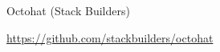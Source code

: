 \documentclass[DIV16,twocolumn,10pt]{scrreprt}
\begin{document}
\begin{hcarentry}{Octohat (Stack Builders)}
\makeheader



\FurtherReading
  \url{https://github.com/stackbuilders/octohat}
\end{hcarentry}
\end{document}
